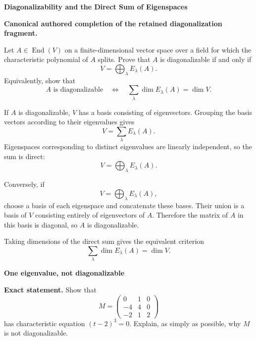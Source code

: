 \begin{problem}[CP-I-0075]
\label{prob:cp-i-0075}
\textbf{Diagonalizability and the Direct Sum of Eigenspaces}

\textbf{Canonical authored completion of the retained diagonalization fragment.}

\hspace*{1.5em}Let \(A\in\operatorname{End}(V)\) on a finite-dimensional vector space over a field
for which the characteristic polynomial of \(A\) splits.
Prove that \(A\) is diagonalizable if and only if
\[
V=\bigoplus_{\lambda}E_\lambda(A).
\]
Equivalently, show that
\[
A\text{ is diagonalizable}
\quad\Longleftrightarrow\quad
\sum_{\lambda}\dim E_\lambda(A)=\dim V.
\]
\end{problem}

\begin{solution}
If \(A\) is diagonalizable, \(V\) has a basis consisting of eigenvectors. Grouping the basis vectors
according to their eigenvalues gives
\[
V=\sum_\lambda E_\lambda(A).
\]
Eigenspaces corresponding to distinct eigenvalues are linearly independent, so the sum is direct:
\[
V=\bigoplus_\lambda E_\lambda(A).
\]

Conversely, if
\[
V=\bigoplus_\lambda E_\lambda(A),
\]
choose a basis of each eigenspace and concatenate these bases. Their union is a basis of \(V\)
consisting entirely of eigenvectors of \(A\). Therefore the matrix of \(A\) in this basis is diagonal,
so \(A\) is diagonalizable.

Taking dimensions of the direct sum gives the equivalent criterion
\[
\sum_\lambda \dim E_\lambda(A)=\dim V.
\]
\end{solution}

\begin{problem}[CP-I-0077]
\label{prob:cp-i-0077}
\textbf{One eigenvalue, not diagonalizable}

\textbf{Exact statement.}
\hspace*{1.5em}Show that
\[
M=\begin{pmatrix}
	0&1&0\\
	-4&4&0\\
	-2&1&2
\end{pmatrix}
\]
has characteristic equation $(t-2)^3=0$. Explain, as simply as possible, why $M$ is not diagonalizable.

\end{problem}

